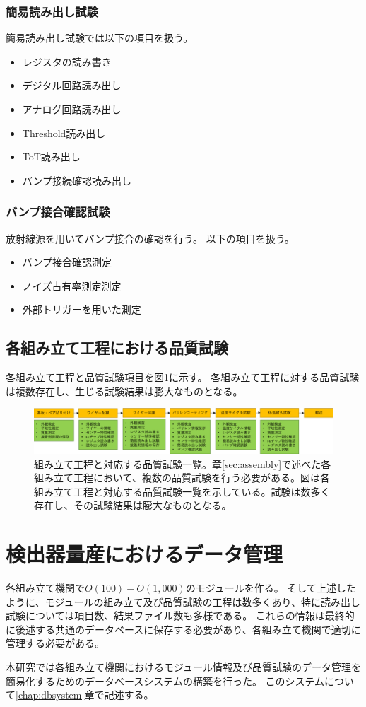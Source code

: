 \subsubsection{簡易読み出し試験}
簡易読み出し試験では以下の項目を扱う。
\begin{itemize}
  \item レジスタの読み書き
  \item デジタル回路読み出し
  \item アナログ回路読み出し
  \item Threshold読み出し
  \item ToT読み出し
  \item バンプ接続確認読み出し
\end{itemize}

\subsubsection{バンプ接合確認試験}
放射線源を用いてバンプ接合の確認を行う。
以下の項目を扱う。
\begin{itemize}
  \item バンプ接合確認測定
  \item ノイズ占有率測定測定
  \item 外部トリガーを用いた測定
\end{itemize}

\subsection{各組み立て工程における品質試験}

各組み立て工程と品質試験項目を図\ref{stage_test_flow}に示す。
各組み立て工程に対する品質試験は複数存在し、生じる試験結果は膨大なものとなる。

\begin{figure}[bpt]\centering
\includegraphics[width=15cm]{stage_test_flow}
\caption[組み立て工程と対応する品質試験一覧]{組み立て工程と対応する品質試験一覧。章\ref{sec:assembly}で述べた各組み立て工程において、複数の品質試験を行う必要がある。図は各組み立て工程と対応する品質試験一覧を示している。試験は数多く存在し、その試験結果は膨大なものとなる。}
\label{stage_test_flow}
\end{figure}

\section{検出器量産におけるデータ管理}
各組み立て機関で$O(100)-O(1,000)$のモジュールを作る。
そして上述したように、モジュールの組み立て及び品質試験の工程は数多くあり、特に読み出し試験については項目数、結果ファイル数も多様である。
これらの情報は最終的に後述する共通のデータベースに保存する必要があり、各組み立て機関で適切に管理する必要がある。

本研究では各組み立て機関におけるモジュール情報及び品質試験のデータ管理を簡易化するためのデータベースシステムの構築を行った。
このシステムについて\ref{chap:dbsystem}章で記述する。

